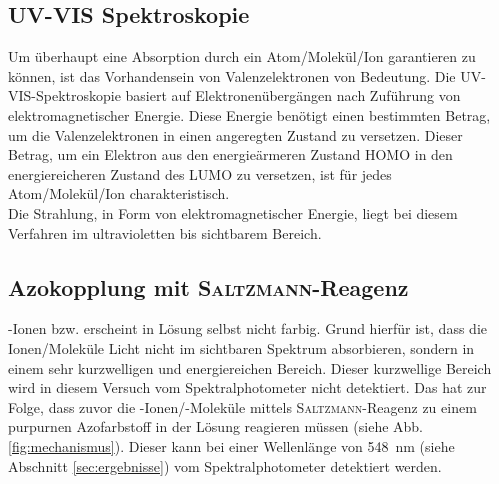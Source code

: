 \subsection*{UV-VIS Spektroskopie}
Um überhaupt eine Absorption durch ein Atom/Molekül/Ion garantieren zu können, ist das Vorhandensein von Valenzelektronen von Bedeutung. Die UV-VIS-Spektroskopie basiert auf Elektronenübergängen nach Zuführung von elektromagnetischer Energie. Diese Energie benötigt einen bestimmten Betrag, um die Valenzelektronen in einen angeregten Zustand zu versetzen. Dieser Betrag, um ein Elektron aus den energieärmeren Zustand HOMO in den energiereicheren Zustand des LUMO zu versetzen, ist für jedes Atom/Molekül/Ion charakteristisch. \\
Die Strahlung, in Form von elektromagnetischer Energie, liegt bei diesem Verfahren im ultravioletten bis sichtbarem Bereich.

\subsection*{Azokopplung mit \textsc{Saltzmann}-Reagenz}
-Ionen bzw.  erscheint in Lösung selbst nicht farbig. Grund hierfür ist, dass die Ionen/Moleküle Licht nicht im sichtbaren Spektrum absorbieren, sondern in einem sehr kurzwelligen und energiereichen Bereich. Dieser kurzwellige Bereich wird in diesem Versuch vom Spektralphotometer nicht detektiert. Das hat zur Folge, dass zuvor die -Ionen/-Moleküle mittels \textsc{Saltzmann}-Reagenz zu einem purpurnen Azofarbstoff in der Lösung reagieren müssen (siehe Abb.\ref{fig:mechanismus}). Dieser kann bei einer Wellenlänge von \SI{548}{\nano \meter} (siehe Abschnitt \ref{sec:ergebnisse}) vom Spektralphotometer detektiert werden.


\newpage





